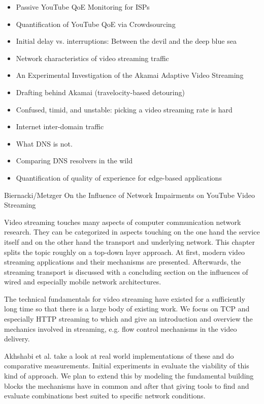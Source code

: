 \begin{itemize}
	\item Passive YouTube QoE Monitoring for ISPs \cite{6296879}
	\item Quantification of YouTube QoE via Crowdsourcing \cite{6123395}
	\item Initial delay vs. interruptions: Between the devil and the deep blue sea \cite{6263849}
	\item Network characteristics of video streaming traffic \cite{Rao:2011:NCV:2079296.2079321}
	\item An Experimental Investigation of the Akamai Adaptive Video Streaming \cite{cicco2010akamai}
	\item Drafting behind Akamai (travelocity-based detouring) \cite{Su:2006:DBA:1159913.1159962}
	\item Confused, timid, and unstable: picking a video streaming rate is hard \cite{Huang:2012:CTU:2398776.2398800}
	\item Internet inter-domain traffic \cite{Labovitz:2010:IIT:2043164.1851194}
	\item What DNS is not. \cite{vixie2009dns}
	\item Comparing DNS resolvers in the wild \cite{ager2010comparing}
	\item Quantification of quality of experience for edge-based applications\cite{hossfeld2007quantification}
\end{itemize}


Biernacki/Metzger On the Influence of Network Impairments on YouTube Video Streaming \cite{cs3518}

Video streaming touches many aspects of computer communication network research. They can be categorized in aspects touching on the one hand the service itself and on the other hand  the transport and underlying network. This chapter splits the topic roughly on a top-down layer approach. At first, modern video streaming applications and their mechanisms are presented. Afterwards, the streaming transport is discussed with a concluding section on the influences of wired and especially mobile network architectures.


The technical fundamentals for video streaming have existed for a sufficiently long time so that there is a large body of existing work. We focus on TCP and especially HTTP streaming to which \cite{watching-video1} and \cite{ma2011mobile} give an introduction and overview the mechanics involved in streaming, e.g. flow control mechanisms in the video delivery.

Akhshabi et al. \cite{akhshabi2011experimental} take a look at real world implementations of these and do comparative measurements. Initial experiments in \cite{akhshabi2011experimental} evaluate the viability of this kind of approach. We plan to extend this by modeling the fundamental building blocks the mechanisms have in common and after that giving tools to find and evaluate combinations best suited to specific network conditions.

